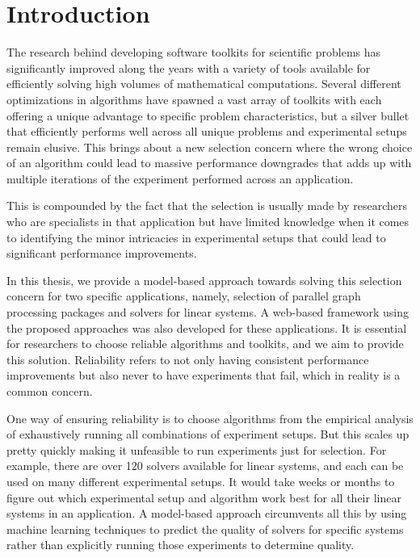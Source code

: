 %   
\chapter{Introduction} 
The research behind developing software toolkits for scientific problems has significantly improved along the years with a variety of tools available for efficiently solving high volumes of mathematical computations. Several different optimizations in algorithms have spawned a vast array of toolkits with each offering a unique advantage to specific problem characteristics, but a silver bullet that efficiently performs well across all unique problems and experimental setups remain elusive. This brings about a new selection concern where the wrong choice of an algorithm could lead to massive performance downgrades that adds up with multiple iterations of the experiment performed across an application. 

This is compounded by the fact that the selection is usually made by researchers who are specialists in that application but have limited knowledge when it comes to identifying the minor intricacies in experimental setups that could lead to significant performance improvements.

In this thesis, we provide a model-based approach towards solving this selection concern for two specific applications, namely, selection of parallel graph processing packages and solvers for linear systems. A web-based framework using the proposed approaches was also developed for these applications. It is essential for researchers to choose reliable algorithms and toolkits, and we aim to provide this solution. Reliability refers to not only having consistent performance improvements but also never to have experiments that fail, which in reality is a common concern.

One way of ensuring reliability is to choose algorithms from the empirical analysis of exhaustively running all combinations of experiment setups. But this scales up pretty quickly making it unfeasible to run experiments just for selection. For example, there are over 120 solvers available for linear systems, and each can be used on many different experimental setups. It would take weeks or months to figure out which experimental setup and algorithm work best for all their linear systems in an application. A model-based approach circumvents all this by using machine learning techniques to predict the quality of solvers for specific systems rather than explicitly running those experiments to determine quality.

